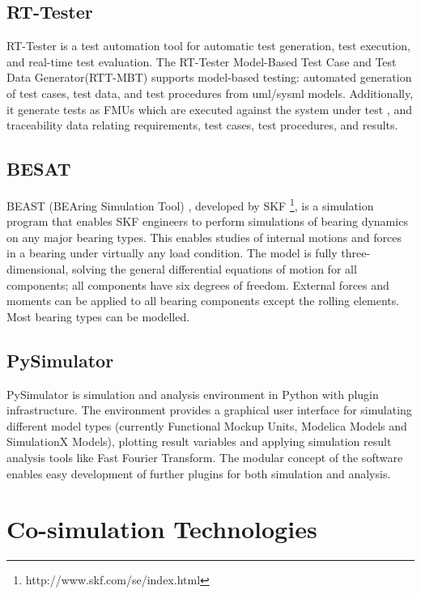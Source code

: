 \subsection{RT-Tester}
\label{sec:rttester}

RT-Tester \cite{rttester,rttester11} is a test automation tool for automatic test generation, test execution, and real-time test evaluation. The RT-Tester Model-Based Test Case and Test Data Generator(RTT-MBT) \cite{rttester,rttester13} supports model-based testing: automated generation of test cases, test data, and test procedures from \acrshort{uml}/\acrshort{sysml} models. Additionally, it generate tests as FMUs which are executed against the system under test , and traceability data relating requirements, test cases, test procedures, and results.

\subsection{BESAT}
\label{sec:beast}

BEAST (BEAring Simulation Tool) \cite{beast}, developed by SKF \footnote{http://www.skf.com/se/index.html}, is a simulation program that enables SKF engineers to perform simulations of bearing dynamics on any major bearing types. This enables studies of internal motions and forces in a bearing under virtually any load condition. The model is fully three-dimensional, solving the general differential equations of motion for all components; all components have six degrees of freedom. External forces and moments can be applied to all bearing components except the rolling elements. Most bearing types can be modelled.

\subsection{PySimulator}
\label{sec:pysimulator}

PySimulator \cite{pysimulator} is simulation and analysis environment in Python with plugin infrastructure. The environment provides a graphical user interface for simulating different model types (currently Functional Mockup Units, Modelica Models and SimulationX Models), plotting result variables and applying simulation result analysis tools like Fast Fourier Transform. The modular concept of the software enables easy development of further plugins for both simulation and analysis. 

\section{Co-simulation Technologies}
\label{sec:cosimulaiton}


